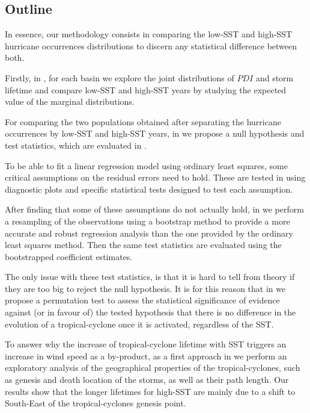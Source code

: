 \subsection{Outline}
In essence, our methodology consists in comparing the low-SST and high-SST hurricane occurrences distributions to discern any statistical difference between both.

Firstly, in , for each basin we explore the joint distributions of $PDI$ and storm lifetime and compare low-SST and high-SST years by studying the expected value of the marginal distributions.

For comparing the two populations obtained after separating the hurricane occurrences by low-SST and high-SST years, in  we propose a null hypothesis and test statistics, which are evaluated in .

\medskip
To be able to fit a linear regression model using ordinary least squares, some critical assumptions on the residual errors need to hold. These are tested in  using diagnostic plots and specific statistical tests designed to test each assumption.

After finding that some of these assumptions do not actually hold, in  we perform a resampling of the observations using a bootstrap method to provide a more accurate and robust regression analysis than the one provided by the ordinary least squares method. Then the same test statistics are evaluated using the bootstrapped coefficient estimates.

\medskip
The only issue with these test statistics, is that it is hard to tell from theory if they are too big to reject the null hypothesis. It is for this reason that in  we propose a permutation test to assess the statistical significance of evidence against (or in favour of) the tested hypothesis that there is no difference in the evolution of a tropical-cyclone once it is activated, regardless of the SST.

\medskip
To answer why the increase of tropical-cyclone lifetime with SST triggers an increase in wind speed as a by-product, as a first approach in  we perform an exploratory analysis of the geographical properties of the tropical-cyclones, such as genesis and death location of the storms, as well as their path length. Our results show that the longer lifetimes for high-SST are mainly due to a shift to South-East of the tropical-cyclones genesis point.

